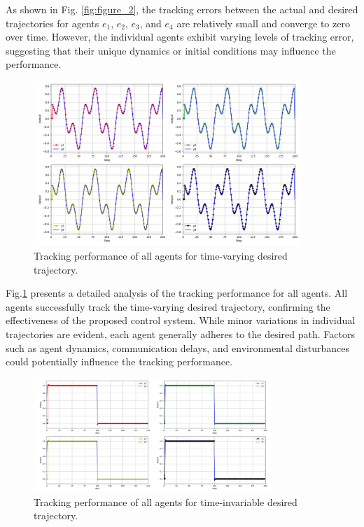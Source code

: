 \documentclass[journal,onecolumn]{IEEEtran}
\begin{document}
As shown in Fig. \ref{fig:figure_2}, the tracking errors between the actual and desired trajectories for agents $e_1$, $e_2$, $e_3$, and $e_4$ are relatively small and converge to zero over time. However, the individual agents exhibit varying levels of tracking error, suggesting that their unique dynamics or initial conditions may influence the performance.

\begin{figure}[H]
    \centering
    \includegraphics[width=0.9\textwidth]{Figure_1.png}
    \caption{Tracking performance of all agents for time-varying desired trajectory.}
    \label{fig:figure_3} %
\end{figure}

Fig.\ref{fig:figure_3} presents a detailed analysis of the tracking performance for all agents. All agents successfully track the time-varying desired trajectory, confirming the effectiveness of the proposed control system. While minor variations in individual trajectories are evident, each agent generally adheres to the desired path. Factors such as agent dynamics, communication delays, and environmental disturbances could potentially influence the tracking performance.

\begin{figure}[H]
    \centering
    \includegraphics[width=0.8\textwidth]{Figure_4.png}
    \caption{Tracking performance of all agents for time-invariable desired trajectory.}
    \label{fig:figure_4} %
\end{figure}
\end{document}

